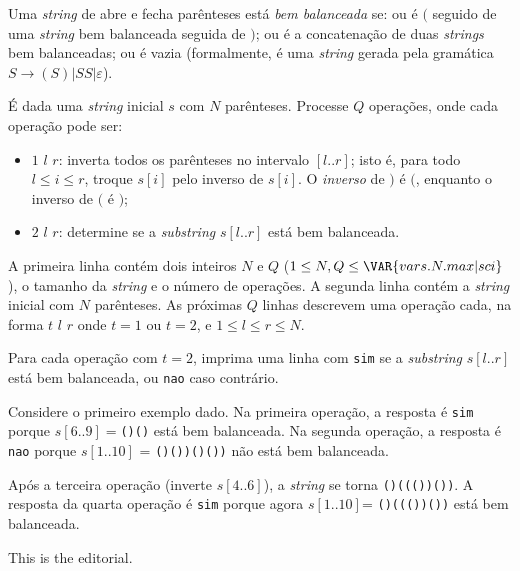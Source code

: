 Uma \textit{string} de abre e fecha parênteses está \textit{bem balanceada} se:
ou é $($ seguido de uma \textit{string} bem balanceada seguida de $)$;
ou é a concatenação de duas \textit{strings} bem balanceadas;
ou é vazia (formalmente, é uma \textit{string} gerada pela gramática $S \rightarrow (S) | SS | \varepsilon$).

É dada uma \textit{string} inicial $s$ com $N$ parênteses. Processe $Q$ operações, onde cada operação pode ser:
\begin{itemize}
    \item $1$ $l$ $r$: inverta todos os parênteses no intervalo
    $[l..r]$; isto é,
    para todo $l \leq i \leq r$, troque $s[i]$ pelo inverso de $s[i]$. O
    \textit{inverso} de $)$ é $($, enquanto o inverso de $($ é $)$;
    \item $2$ $l$ $r$: determine se a \textit{substring} $s[l..r]$ está bem balanceada.
\end{itemize}


A primeira linha contém dois inteiros $N$ e $Q$
($1 \leq N, Q \leq \VAR{vars.N.max | sci}$), o tamanho da \textit{string} e o
número de operações.
A segunda linha contém a \textit{string} inicial com $N$ parênteses.
As próximas $Q$ linhas descrevem uma operação cada, na forma
$t$ $l$ $r$ onde $t=1$ ou $t=2$, e $1 \leq l \leq r \leq N$.


Para cada operação com $t=2$, imprima uma linha com \texttt{sim} se a \textit{substring}
$s[l..r]$ está bem balanceada, ou \texttt{nao} caso contrário.


Considere o primeiro exemplo dado.
Na primeira operação, a resposta é \texttt{sim} porque
$s[6..9] = $\texttt{()()} está bem balanceada. Na segunda operação, a resposta é
\texttt{nao} porque $s[1..10]$ = \texttt{()())()())} não está bem balanceada.

Após a terceira operação (inverte $s[4..6]$), a \textit{string} se torna
\texttt{()((())())}. A resposta da quarta operação é \texttt{sim} porque agora
$s[1..10]$= \texttt{()((())())} está bem balanceada.


This is the editorial.

